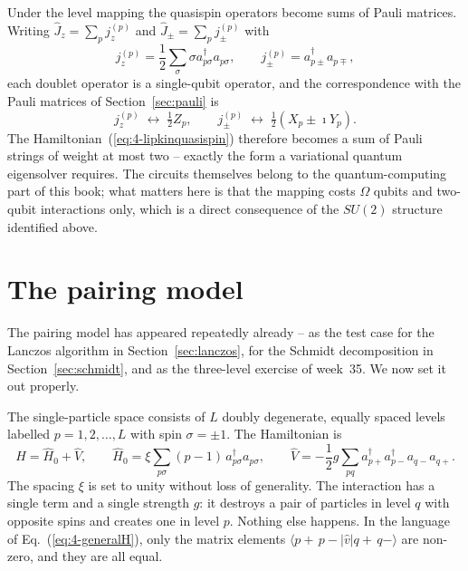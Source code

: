 Under the level mapping the quasispin operators become sums of Pauli matrices.
Writing $\hat{J}_z=\sum_p j_z^{(p)}$ and $\hat{J}_{\pm}=\sum_p
j_{\pm}^{(p)}$ with
\begin{equation}
  j_z^{(p)} = \frac{1}{2}\sum_{\sigma}\sigma
    a_{p\sigma}^{\dagger}a_{p\sigma},
  \qquad
  j_{\pm}^{(p)} = a_{p\pm}^{\dagger}a_{p\mp},
  \label{eq:4-onebodyquasispin}
\end{equation}
each doublet operator is a single-qubit operator, and the correspondence with
the Pauli matrices of Section~\ref{sec:pauli} is
\begin{equation}
  j_z^{(p)} \;\longleftrightarrow\; \tfrac12 Z_p,
  \qquad
  j_{\pm}^{(p)} \;\longleftrightarrow\; \tfrac12\left(X_p \pm \imath Y_p\right).
  \label{eq:4-paulimapping}
\end{equation}
The Hamiltonian~(\ref{eq:4-lipkinquasispin}) therefore becomes a sum of Pauli
strings of weight at most two -- exactly the form a variational quantum
eigensolver requires.  The circuits themselves belong to the
quantum-computing part of this book; what matters here is that the mapping
costs $\Omega$ qubits and two-qubit interactions only, which is a direct
consequence of the $SU(2)$ structure identified above.

\section{The pairing model}
\label{sec:pairingmodel}

The pairing model has appeared repeatedly already -- as the test case for the
Lanczos algorithm in Section~\ref{sec:lanczos}, for the Schmidt decomposition
in Section~\ref{sec:schmidt}, and as the three-level exercise of week~35.  We
now set it out properly.

The single-particle space consists of $L$ doubly degenerate, equally spaced
levels labelled $p=1,2,\dots,L$ with spin $\sigma=\pm1$.  The Hamiltonian is
\begin{equation}
  \hat{H} = \hat{H}_0 + \hat{V},
  \qquad
  \hat{H}_0 = \xi\sum_{p\sigma}(p-1)\,a_{p\sigma}^{\dagger}a_{p\sigma},
  \qquad
  \hat{V} = -\frac{1}{2}g\sum_{pq}
    a^{\dagger}_{p+}a^{\dagger}_{p-}a_{q-}a_{q+} .
  \label{eq:4-pairingH}
\end{equation}
The spacing $\xi$ is set to unity without loss of generality.  The interaction
has a single term and a single strength $g$: it destroys a pair of particles
in level $q$ with opposite spins and creates one in level $p$.  Nothing else
happens.  In the language of Eq.~(\ref{eq:4-generalH}), only the matrix
elements $\langle p+\,p-|\hat{v}|q+\,q-\rangle$ are non-zero, and they are all
equal.

